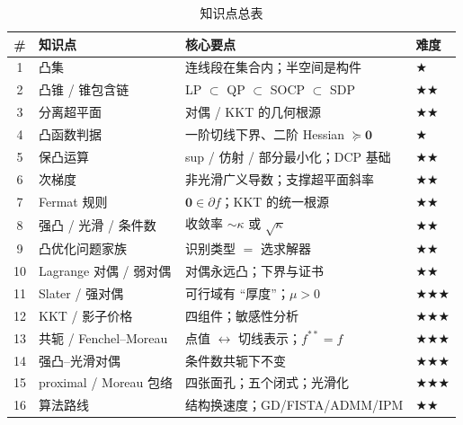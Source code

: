 \begin{table}[H]\centering\small
\caption{知识点总表}
\label{tab:cvx-knowledge}
\begin{tabular}{clll}
\toprule
\# & 知识点 & 核心要点 & 难度 \\
\midrule
1 & 凸集 & 连线段在集合内；半空间是构件 & \(\bigstar\) \\
2 & 凸锥 / 锥包含链 & LP $\subset$ QP $\subset$ SOCP $\subset$ SDP & \(\bigstar\bigstar\) \\
3 & 分离超平面 & 对偶 / KKT 的几何根源 & \(\bigstar\bigstar\) \\
4 & 凸函数判据 & 一阶切线下界、二阶 Hessian $\succeq\mathbf 0$ & \(\bigstar\) \\
5 & 保凸运算 & sup / 仿射 / 部分最小化；DCP 基础 & \(\bigstar\bigstar\) \\
6 & 次梯度 & 非光滑广义导数；支撑超平面斜率 & \(\bigstar\bigstar\) \\
7 & Fermat 规则 & $\mathbf 0\in\partial f$；KKT 的统一根源 & \(\bigstar\bigstar\) \\
8 & 强凸 / 光滑 / 条件数 & 收敛率 $\sim\kappa$ 或 $\sqrt\kappa$ & \(\bigstar\bigstar\) \\
9 & 凸优化问题家族 & 识别类型 $=$ 选求解器 & \(\bigstar\bigstar\) \\
10 & Lagrange 对偶 / 弱对偶 & 对偶永远凸；下界与证书 & \(\bigstar\bigstar\) \\
11 & Slater / 强对偶 & 可行域有 “厚度”；$\mu>0$ & \(\bigstar\bigstar\bigstar\) \\
12 & KKT / 影子价格 & 四组件；敏感性分析 & \(\bigstar\bigstar\bigstar\) \\
13 & 共轭 / Fenchel--Moreau & 点值 $\leftrightarrow$ 切线表示；$f^{\ast\ast}=f$ & \(\bigstar\bigstar\bigstar\) \\
14 & 强凸--光滑对偶 & 条件数共轭下不变 & \(\bigstar\bigstar\bigstar\) \\
15 & proximal / Moreau 包络 & 四张面孔；五个闭式；光滑化 & \(\bigstar\bigstar\bigstar\) \\
16 & 算法路线 & 结构换速度；GD/FISTA/ADMM/IPM & \(\bigstar\bigstar\) \\
\bottomrule
\end{tabular}
\end{table}

